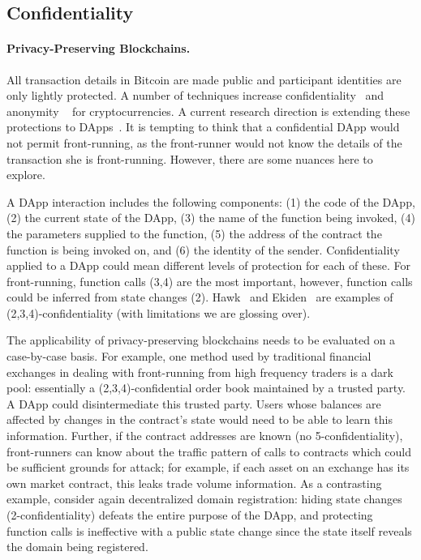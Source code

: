 \subsection{Confidentiality}

\paragraph{Privacy-Preserving Blockchains.}

All transaction details in Bitcoin are made public and participant identities are only lightly protected. A number of techniques increase confidentiality~\cite{bunzBulletproofs,maxwell2015confidential} and anonymity ~\cite{miers2013zerocoin,cryptoeprint2015,sasson2014zerocash} for cryptocurrencies. A current research direction is extending these protections to DApps~\cite{aztec2018,ZoeEth2017}. It is tempting to think that a confidential DApp would not permit front-running, as the front-runner would not know the details of the transaction she is front-running. However, there are some nuances here to explore.

A DApp interaction includes the following components: (1) the code of the DApp, (2) the current state of the DApp, (3) the name of the function being invoked, (4) the parameters supplied to the function, (5) the address of the contract the function is being invoked on, and (6) the identity of the sender. Confidentiality applied to a DApp could mean different levels of protection for each of these. For front-running, function calls (3,4) are the most important, however, function calls could be inferred from state changes (2). Hawk~\cite{kosba2016hawk} and Ekiden~\cite{cheng2018ekiden} are examples of (2,3,4)-confidentiality (with limitations we are glossing over).

The applicability of privacy-preserving blockchains needs to be evaluated on a case-by-case basis. For example, one method used by traditional financial exchanges in dealing with front-running from high frequency traders is a dark pool: essentially a (2,3,4)-confidential order book maintained by a trusted party. A DApp could disintermediate this trusted party. Users whose balances are affected by changes in the contract's state would need to be able to learn this information. Further, if the contract addresses are known (\ie no 5-confidentiality), front-runners can know about the traffic pattern of calls to contracts which could be sufficient grounds for attack; for example, if each asset on an exchange has its own market contract, this leaks trade volume information. As a contrasting example, consider again decentralized domain registration: hiding state changes (2-confidentiality) defeats the entire purpose of the DApp, and protecting function calls is ineffective with a public state change since the state itself reveals the domain being registered.

